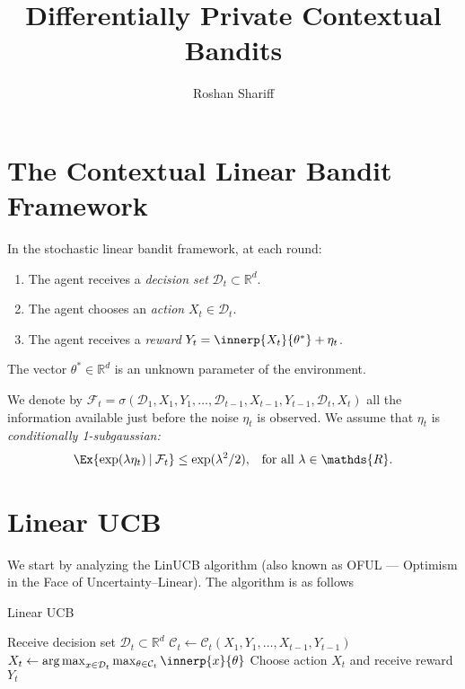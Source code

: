 \documentclass{article}
\title{Differentially Private Contextual Bandits}
\author{Roshan Shariff}
\newcommand{\Real}{\mathds{R}}
\DeclareMathOperator*{\argmax}{arg\,max}
\newcommand\given[1][\delimsize]{%
  \providecommand{\delimsize}{}
  \nonscript\:#1\vert\allowbreak\nonscript\:\mathopen{}
}
\newcommand{\Dset}[1]{\mathcal{D}_{#1}}
\newcommand{\Cset}[1]{\mathcal{C}_{#1}}
\begin{document}
\maketitle

\section{The Contextual Linear Bandit Framework}

In the stochastic linear bandit framework, at each round:
\begin{enumerate}
\item The agent receives a \emph{decision set} $\mathcal{D}_t \subset
  \Real^d$.
\item The agent chooses an \emph{action} $X_t \in \mathcal{D}_t$.
\item The agent receives a \emph{reward} $Y_t = \innerp{X_t}{\theta^*} + \eta_t$.
\end{enumerate}
The vector $\theta^*\in\Real^d$ is an unknown parameter of the
environment.

\begin{assumption}\label{assumption:subgaussian-noise}
  We denote by
  $\mathcal{F}_t =
  \sigma(\mathcal{D}_1,X_1,Y_1,\dotsc,\mathcal{D}_{t-1},X_{t-1},Y_{t-1},\mathcal{D}_t,X_t)$
  all the information available just before the noise $\eta_t$ is
  observed.  We assume that $\eta_t$ is \emph{conditionally
    1-subgaussian:}
  \begin{align*}
    \Ex{\exp(\lambda\eta_t)\given \mathcal{F}_t} &\le \exp(\lambda^2/2),
    &\text{for all } \lambda\in\Real.
  \end{align*}
\end{assumption}
\section{Linear UCB}

We start by analyzing the LinUCB algorithm (also known as OFUL ---
Optimism in the Face of Uncertainty--Linear).  The algorithm is as follows

\begin{algorithm}
  \caption{Linear UCB}\label{alg:linucb}
  \begin{algorithmic}
    \State Receive decision set $\Dset{t} \subset \Real^d$
    \State $\Cset{t} \gets \Cset{t}(X_1,Y_1,\dotsc,X_{t-1},Y_{t-1})$
    \State $X_t \gets \argmax_{x\in\Dset{t}}
    \max_{\theta\in\Cset{t}} \innerp{x}{\theta}$
    \State Choose action $X_t$ and receive reward $Y_t$
    \EndFor
  \end{algorithmic}
\end{algorithm}
\end{document}

